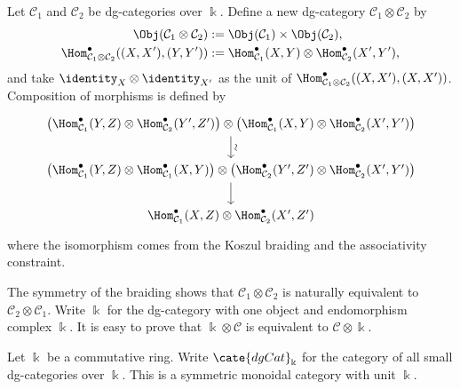 \begin{definition}\label{def:dgCat-tensor}
	Let $\mathcal{C}_1$ and $\mathcal{C}_2$ be dg-categories over $\Bbbk$.
	Define a new dg-category $\mathcal{C}_1\otimes\mathcal{C}_2$ by
	\begin{align*}
		\Obj(\mathcal{C}_1 \otimes \mathcal{C}_2) & := \Obj(\mathcal{C}_1) \times \Obj(\mathcal{C}_2), \\
		\Hom_{\mathcal{C}_1 \otimes \mathcal{C}_2}^\bullet((X, X'), (Y, Y')) & := \Hom_{\mathcal{C}_1}^\bullet(X, Y) \otimes \Hom_{\mathcal{C}_2}^\bullet(X', Y'),
	\end{align*}
	and take $\identity_X\otimes\identity_{X'}$ as the unit of
	$\Hom_{\mathcal{C}_1\otimes\mathcal{C}_2}^\bullet((X,X'),(X,X'))$.
	Composition of morphisms is defined by
	\[\begin{tikzcd}
		\left( \Hom_{\mathcal{C}_1}^\bullet(Y, Z) \otimes \Hom_{\mathcal{C}_2}^\bullet(Y', Z')\right) \otimes
		\left( \Hom_{\mathcal{C}_1}^\bullet(X, Y) \otimes \Hom_{\mathcal{C}_2}^\bullet(X', Y') \right) \arrow[d, "\sim" sloped] \\
		\left( \Hom_{\mathcal{C}_1}^\bullet(Y, Z) \otimes \Hom_{\mathcal{C}_1}^\bullet(X, Y) \right) \otimes
		\left( \Hom_{\mathcal{C}_2}^\bullet(Y', Z') \otimes \Hom_{\mathcal{C}_2}^\bullet(X', Y') \right) \arrow[d] \\
		\Hom_{\mathcal{C}_1}^\bullet(X, Z) \otimes \Hom_{\mathcal{C}_2}^\bullet(X', Z')
	\end{tikzcd}\]
	where the isomorphism comes from the Koszul braiding and the associativity
	constraint.
\end{definition}

The symmetry of the braiding shows that
$\mathcal{C}_1\otimes\mathcal{C}_2$ is naturally equivalent to
$\mathcal{C}_2\otimes\mathcal{C}_1$. Write $\Bbbk$ for the dg-category with
one object and endomorphism complex $\Bbbk$. It is easy to prove that
$\Bbbk\otimes\mathcal{C}$ is equivalent to $\mathcal{C}\otimes\Bbbk$.

\begin{definition}\label{def:dgCat-as-cat}
	Let $\Bbbk$ be a commutative ring. Write $\cate{dgCat}_{\Bbbk}$ for the
	category of all small dg-categories over $\Bbbk$. This is a symmetric
	monoidal category with unit $\Bbbk$.
\end{definition}

